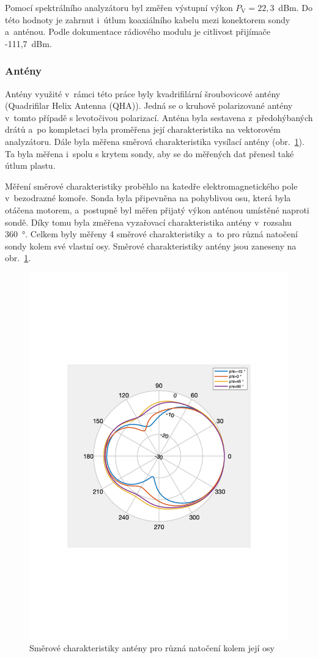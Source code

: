 \documentclass[twoside]{ctuthesis}
\newcommand{\mt}[1]{\text{#1}}
\theoremstyle{plain}
\theoremstyle{definition}
\theoremstyle{note}
\begin{document}
			Pomocí spektrálního analyzátoru byl změřen výstupní výkon $P_\mt{V} = 22{,}3$~dBm. Do této hodnoty je zahrnut i~útlum koaxiálního kabelu mezi konektorem sondy a~anténou. Podle dokumentace rádiového modulu \cite{telit} je citlivost přijímače -111{,}7~dBm.

			\subsubsection{Antény}
			\label{sec:anteny}
			Antény využité v~rámci této práce byly kvadrifilární šroubovicové antény (Quadrifilar Helix Antenna (QHA)). Jedná se o kruhově polarizované antény v~tomto případě s levotočivou polarizací. Anténa byla sestavena z~předohýbaných drátů a~po kompletaci byla proměřena její charakteristika na vektorovém analyzátoru. Dále byla měřena směrová charakteristika vysílací antény (obr.~\ref{graph:radiation:char}). Ta byla měřena i~spolu s krytem sondy, aby se do měřených dat přenesl také útlum plastu. 

			Měření směrové charakteristiky proběhlo na katedře elektromagnetického pole v~bezodrazné komoře. Sonda byla připevněna na pohyblivou osu, která byla otáčena motorem, a~postupně byl měřen přijatý výkon anténou umístěné naproti sondě. Díky tomu byla změřena vyzařovací charakteristika antény v~rozsahu 360~°. Celkem byly měřeny 4 směrové charakteristiky a~to pro různá natočení sondy kolem své vlastní osy. Směrové charakteristiky antény jsou zaneseny na obr.~\ref{graph:radiation:char}.

			\begin{figure}[hbtp]
				\centering
				\includegraphics[width=.5\textwidth]{Graphs/radiation_plot.pdf}
				\caption{Směrové charakteristiky antény pro různá natočení kolem její osy}
				\label{graph:radiation:char}
			\end{figure}
\end{document}
